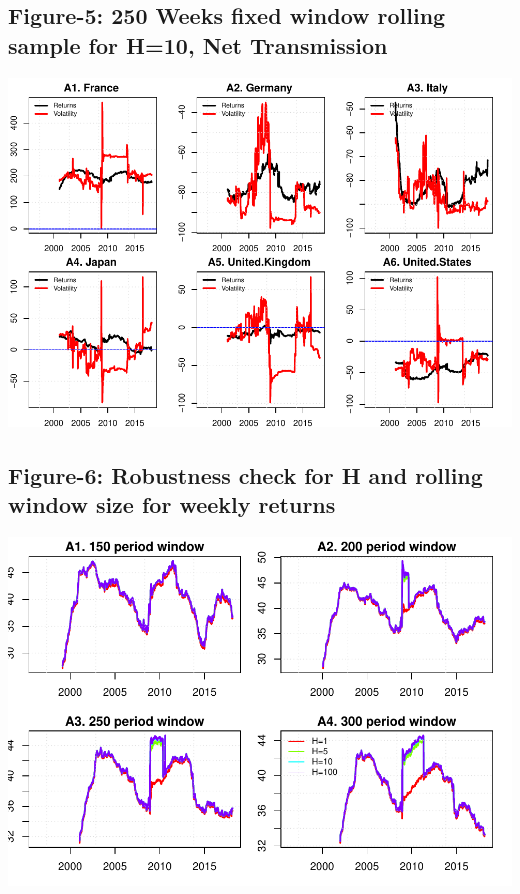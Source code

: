 \documentclass[]{elsarticle} %
\makeatletter
\def\maxwidth{\ifdim\Gin@nat@width>\linewidth\linewidth
\else\Gin@nat@width\fi}
\let\Oldincludegraphics\includegraphics
\renewcommand{\includegraphics}[1]{\Oldincludegraphics[width=\maxwidth]{#1}}
\makeatother
\begin{document}
\subsection{\texorpdfstring{\textbf{Figure-5: 250 Weeks fixed window
rolling sample for H=10, Net
Transmission}}{Figure-5: 250 Weeks fixed window rolling sample for H=10, Net Transmission}}\label{figure-5-250-weeks-fixed-window-rolling-sample-for-h10-net-transmission}

\includegraphics{Main_files/figure-latex/unnamed-chunk-9-1.pdf}

\subsection{\texorpdfstring{\textbf{Figure-6: Robustness check for H and
rolling window size for weekly
returns}}{Figure-6: Robustness check for H and rolling window size for weekly returns}}\label{figure-6-robustness-check-for-h-and-rolling-window-size-for-weekly-returns}

\includegraphics{Main_files/figure-latex/unnamed-chunk-10-1.pdf}
\end{document}
